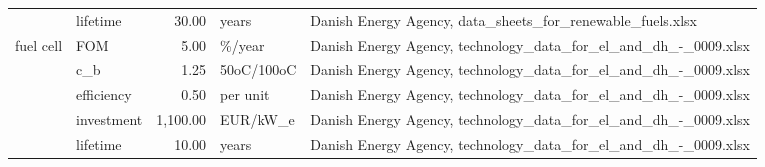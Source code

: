 \begin{longtable}{p{5cm}p{3cm}rp{3cm}p{11cm}}
                      & lifetime &          30.00 &                             years &                                                                                                                                                                                                                                                                           Danish Energy Agency, data\_sheets\_for\_renewable\_fuels.xlsx \\
fuel cell & FOM &           5.00 &                            \%/year &                                                                                                                                                                                                                                                                      Danish Energy Agency, technology\_data\_for\_el\_and\_dh\_-\_0009.xlsx \\
                      & c\_b &           1.25 &                        50oC/100oC &                                                                                                                                                                                                                                                                      Danish Energy Agency, technology\_data\_for\_el\_and\_dh\_-\_0009.xlsx \\
                      & efficiency &           0.50 &                          per unit &                                                                                                                                                                                                                                                                      Danish Energy Agency, technology\_data\_for\_el\_and\_dh\_-\_0009.xlsx \\
                      & investment &       1,100.00 &                          EUR/kW\_e &                                                                                                                                                                                                                                                                      Danish Energy Agency, technology\_data\_for\_el\_and\_dh\_-\_0009.xlsx \\
                      & lifetime &          10.00 &                             years &                                                                                                                                                                                                                                                                      Danish Energy Agency, technology\_data\_for\_el\_and\_dh\_-\_0009.xlsx \\

\end{longtable}
